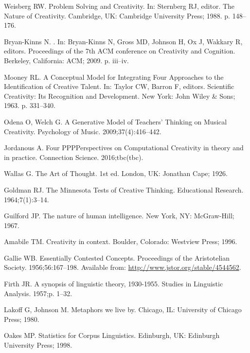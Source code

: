 \documentclass[10pt,letterpaper]{article}
\begin{document}
\begin{thebibliography}{10}
Weisberg RW.
\newblock Problem Solving and Creativity.
\newblock In: Sternberg RJ, editor. The Nature of Creativity. Cambridge, UK:
  Cambridge University Press; 1988. p. 148--176.

Bryan-Kinns N.
.
\newblock In: Bryan-Kinns N, Gross MD, Johnson H, Ox J, Wakkary R, editors.
  Proceedings of the 7th ACM conference on Creativity and Cognition. Berkeley,
  California: ACM; 2009. p. iii--iv.

Mooney RL.
\newblock A Conceptual Model for Integrating Four Approaches to the
  Identification of Creative Talent.
\newblock In: Taylor CW, Barron F, editors. Scientific Creativity: Its
  Recognition and Development. New York: John Wiley \& Sons; 1963. p. 331--340.

Odena O, Welch G.
\newblock A Generative Model of Teachers' Thinking on Musical Creativity.
\newblock Psychology of Music. 2009;37(4):416--442.

Jordanous A.
\newblock Four PPPPerspectives on Computational Creativity in theory and in
  practice.
\newblock Connection Science. 2016;tbc(tbc).

Wallas G.
\newblock The Art of Thought.
\newblock 1st ed. London, UK: Jonathan Cape; 1926.

Goldman RJ.
\newblock The {M}innesota Tests of Creative Thinking.
\newblock Educational Research. 1964;7(1):3--14.

Guilford JP.
\newblock The nature of human intelligence.
\newblock New York, NY: McGraw-Hill; 1967.

Amabile TM.
\newblock Creativity in context.
\newblock Boulder, Colorado: Westview Press; 1996.

Gallie WB.
\newblock Essentially Contested Concepts.
\newblock Proceedings of the Aristotelian Society. 1956;56:167--198.
\newblock Available from: \url{http://www.jstor.org/stable/4544562}.

Firth JR.
\newblock A synopsis of linguistic theory, 1930-1955.
\newblock Studies in Linguistic Analysis. 1957;p. 1--32.

Lakoff G, Johnson M.
\newblock Metaphors we live by.
\newblock Chicago, IL: University of Chicago Press; 1980.

Oakes MP.
\newblock Statistics for Corpus Linguistics.
\newblock Edinburgh, UK: Edinburgh University Press; 1998.


\end{thebibliography}
\end{document}
